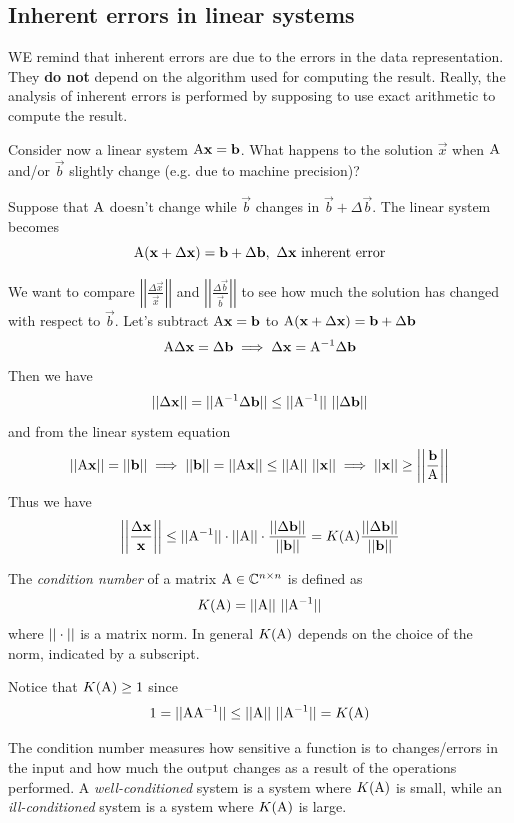\subsection{Inherent errors in linear systems}
WE remind that inherent errors are due to the errors in the data representation. They \textbf{do not} depend on the algorithm used for computing the result. Really, the analysis of inherent errors is performed by supposing to use exact arithmetic to compute the result. 

Consider now a linear system $\mathrm{A}\mathbf{x} = \mathbf{b}$. What happens to the solution $\vec{x}$ when $\mathrm{A}$ and/or $\vec{b}$ slightly change (e.g. due to machine precision)?

Suppose that $\mathrm{A}$ doesn't change while $\vec{b}$ changes in $\vec{b} + \Delta\vec{b}$. The linear system becomes
$$ \mathrm{A}(\mathbf{x} + \Delta\mathbf{x}) = \mathbf{b} + \Delta\mathbf{b},\ \Delta\mathbf{x}\ \text{inherent error} $$

We want to compare $\left|\left|\frac{\Delta\vec{x}}{\vec{x}}\right|\right|$ and $\left|\left|\frac{\Delta\vec{b}}{\vec{b}}\right|\right|$ to see how much the solution has changed with respect to $\vec{b}$. Let's subtract $\mathrm{A}\mathbf{x} = \mathbf{b}$ to $\mathrm{A}(\mathbf{x} + \Delta\mathbf{x}) = \mathbf{b} + \Delta\mathbf{b}$
$$ \mathrm{A}\Delta\mathbf{x} = \Delta\mathbf{b} \implies \Delta\mathbf{x} = \mathrm{A}^{-1}\Delta\mathbf{b} $$
Then we have
$$ \norm{\Delta\vec{x}} = \norm{\inv{A}\Delta\vec{b}} \leq \norm{\inv{A}}\ \norm{\Delta\vec{b}} $$
and from the linear system equation
$$ \norm{\mat{A}\vec{x}} = \norm{\vec{b}} \implies \norm{\vec{b}} = \norm{\mat{A}\vec{x}} \leq \norm{\mat{A}}\ \norm{\vec{x}} \implies \norm{\vec{x}} \geq \left|\left|\frac{\vec{b}}{\mat{A}}\right|\right| $$
Thus we have
$$ \left|\left|\frac{\Delta\mathbf{x}}{\mathbf{x}}\right|\right| \leq ||\mathrm{A}^{-1}|| \cdot ||\mathrm{A}|| \cdot \frac{||\Delta\mathbf{b}||}{||\mathbf{b}||} = K(\mathrm{A)}\frac{||\Delta\mathbf{b}||}{||\mathbf{b}||} $$
\begin{definition}
    The \textit{condition number} of a matrix $\mathrm{A} \in \mathbb{C}^{n \times n}$ is defined as
    $$ K(\mat{A}) = \norm{\mat{A}}\ \norm{\inv{A}} $$
    where $||\cdot||$ is a matrix norm. In general $K(\mathrm{A})$ depends on the choice of the norm, indicated by a subscript.
\end{definition}
Notice that $K(\mathrm{A}) \geq 1$ since
$$ 1 = ||\mathrm{A}\mathrm{A}^{-1}|| \leq ||\mathrm{A}||\ ||\mathrm{A}^{-1}|| = K(\mathrm{A}) $$

The condition number measures how sensitive a function is to changes/errors in the input and how much the output changes as a result of the operations performed. A \textit{well-conditioned} system is a system where $K(\mathrm{A})$ is small, while an \textit{ill-conditioned} system is a system where $K(\mathrm{A})$ is large.

